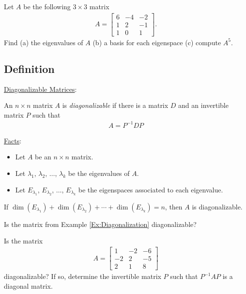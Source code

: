 \documentclass[12pt,a4paper]{article}
\newcounter{example}[section]
\begin{document}
	\newpage
	
	\begin{example}\label{Ex:Diagonalization}
	Let $A$ be the following $3 \times 3$ matrix
		\begin{align*}
		A = \begin{bmatrix}
		6 & -4 & -2 \\
		1 & 2 & -1 \\
		1 & 0 & 1 
		\end{bmatrix} .
		\end{align*}
	Find (a) the eigenvalues of $A$ (b) a basis for each eigenspace (c) compute $A^5$.
	\end{example}
	
	\newpage
	
	\phantom{2}
	
	\newpage
	
	\subsection{Definition}
	\underline{Diagonalizable Matrices}:
	
	An $n \times n$ matrix $A$ is \textit{diagonalizable} if there is a matrix $D$ and an invertible matrix $P$ such that
		\begin{align*}
		A = P^{-1} D P
		\end{align*}
		
	\underline{Facts}:
	\begin{itemize}
	\item Let $A$ be an $n \times n$ matrix.
	\item Let $\lambda_1$, $\lambda_2$, $\ldots$, $\lambda_k$ be the eigenvalues of $A$.
	\item Let $E_{\lambda_1}$, $E_{\lambda_2}$, $\ldots$, $E_{\lambda_k}$ be the eigenspaces associated to each eigenvalue.
	\end{itemize}
	If $\dim (E_{\lambda_1}) + \dim (E_{\lambda_2}) + \cdots + \dim (E_{\lambda_k}) = n$, then $A$ is diagonalizable.
		
	\begin{example}
	Is the matrix from Example \ref{Ex:Diagonalization} diagonalizable?
	\end{example}
	
	\newpage
	
	\begin{example}
	Is the matrix
		\begin{align*}
		A = \begin{bmatrix}
		1 & -2 & -6 \\ -2 & 2 & -5 \\ 2 & 1 & 8
		\end{bmatrix}
		\end{align*}
	diagonalizable? If so, determine the invertible matrix $P$ such that $P^{-1} A P$ is a diagonal matrix.
	\end{example}
	
\end{document}
